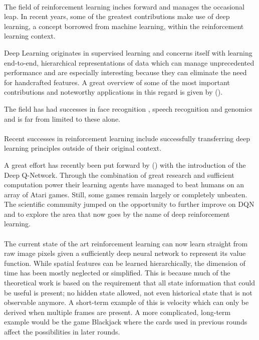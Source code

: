 \paragraph{}
The field of reinforcement learning
inches forward and manages the occasional leap.
In recent years,
some of the greatest contributions
make use of deep learning,
a concept borrowed from machine learning,
within the reinforcement learning context.

Deep Learning originates in supervised learning
and concerns itself with learning
end-to-end, hierarchical representations of data
which can manage unprecedented performance
and are especially interesting
because they can eliminate the need for handcrafted features.
A great overview of
some of the most important contributions
and noteworthy applications
in this regard is given by
\citeauthor{Y.2015a} (\citeyear{Y.2015a}).

The field has had successes in
face recognition
\parencite{lawrence1997face,wolf2014deepface},
speech recognition
\parencite{dahl2012context,graves2013speech}
and
genomics
\parencite{leung2014deep,xiong2015human}
and is far from limited to these alone.

\paragraph{}
Recent successes in reinforcement learning
include successfully transferring deep learning principles
outside of their original context.

A great effort has recently been put forward by
\citeauthor{Mnih2015} (\citeyear{Mnih2013,Mnih2015})
with the introduction of the Deep Q-Network.
Through the combination of great research and sufficient computation power
their learning agents have managed to beat humans
on an array of Atari games.
Still, some games remain largely or completely unbeaten.
The scientific community jumped
on the opportunity to further improve on DQN
and to explore the area
that now goes by the name of deep reinforcement learning.

\paragraph{}
The current state of the art reinforcement learning
can now learn straight from raw image pixels
given a sufficiently deep neural network
to represent its value function.
While spatial features can be learned hierarchically,
the dimension of time has been mostly neglected or simplified.
This is because much of the theoretical work is based
on the requirement that all state information that
could be useful is present;
no hidden state allowed,
not even historical state that is not observable anymore.
A short-term example of this is velocity
which can only be derived when multiple frames are present.
A more complicated, long-term example
would be the game Blackjack
where the cards used in previous rounds
affect the possibilities in later rounds.

